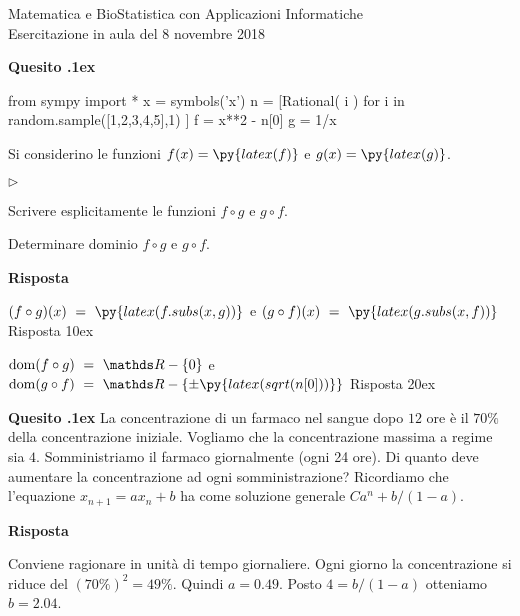 \documentclass[11pt,twoside,a4paper]{article}
\newcommand{\mylabel}[1]{#1\hfill}
\renewenvironment{itemize}
  {\begin{list}{$\triangleright$}{%
   \setlength{\parskip}{0mm}
   \setlength{\topsep}{.4\baselineskip}
   \setlength{\rightmargin}{0mm}
   \setlength{\listparindent}{0mm}
   \setlength{\itemindent}{0mm}
   \setlength{\labelwidth}{2ex}
   \setlength{\itemsep}{.4\baselineskip}
   \setlength{\parsep}{0mm}
   \setlength{\partopsep}{0mm}
   \setlength{\labelsep}{1ex}
   \setlength{\leftmargin}{\labelwidth+\labelsep}
   \let\makelabel\mylabel}}{%
   \end{list}\vspace*{-1.3mm}}
\newcounter{quesito}
\newenvironment{question}{\addtocounter{quesito}{1}\par\textbf{Quesito \thequesito.\kern1ex}}{\vspace{0.5\parskip}}
\newenvironment{xquestion}{\bigskip\addtocounter{quesito}{1}\bigskip\bigskip\par\textbf{Quesito \thequesito.\kern1ex}}{\vspace{\parskip}}
\newenvironment{answer}{\par\textbf{Risposta\quad}}{\vspace{\parskip}}
\begin{document}
\colorbox{blue!10}{\begin{minipage}{\textwidth}
Matematica e BioStatistica con Applicazioni Informatiche\\
Esercitazione in aula del 8 novembre 2018
\end{minipage}}

\bigskip

\begin{xquestion}
\def\RR{{\mathds R}}
\def\dom{{\rm dom}}
\def\range{{\rm im}}
\begin{pycode}
from sympy import *
x = symbols('x')
n = [Rational( i ) for i in random.sample([1,2,3,4,5],1) ]
f = x**2 - n[0]
g = 1/x
\end{pycode}
Si considerino le funzioni $\displaystyle f(x) = \py{latex(f)}$ e $\displaystyle g(x) =\py{latex(g)}$.
\begin{itemize}
\item[1.] Scrivere esplicitamente le funzioni $f \circ g$ e $g \circ f$.
\item[2.] Determinare dominio $f \circ g$ e $g \circ f$.
\end{itemize}
\begin{answer}

{\color{blue}
$\displaystyle (f \circ g) (x)\ =\ \py{latex(f.subs(x,g))}$
\qquad e\qquad 
$\displaystyle (g \circ f) (x)\ =\ \py{latex(g.subs(x,f))}$
\hfill Risposta 1\kern0ex}

\smallskip
{\color{blue}
$\dom (f \circ g)\ =\ \RR - \{0\}$
\qquad e\qquad 
$\dom (g \circ f)\ =\ \RR - \{\pm \py{latex(sqrt(n[0]))}\}$
\hfill Risposta 2\kern0ex}

\end{answer}
\end{xquestion}


\begin{question}
La concentrazione di un farmaco nel sangue dopo $12$ ore è il $70\%$ della concentrazione iniziale. Vogliamo che la concentrazione massima a regime sia $4$. Somministriamo il farmaco giornalmente (ogni 24 ore). Di quanto deve aumentare la concentrazione ad ogni somministrazione? Ricordiamo che l'equazione $x_{n+1}=ax_n +b$ ha come soluzione generale $Ca^n+b/(1-a)$.
\begin{answer}

Conviene ragionare in unità di tempo giornaliere. Ogni giorno la concentrazione si riduce del $(70\%)^2=49\%$. Quindi $a=0.49$. Posto $4=b/(1-a)$ otteniamo $b=2.04$.

\end{answer}
\end{question}
\end{document}
